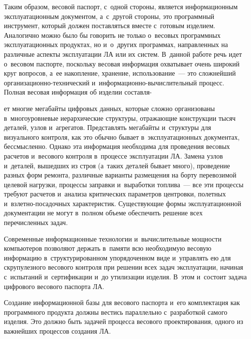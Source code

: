 \begin{multicols}{2}
  Таким образом, весовой паспорт, с~одной стороны, является 
информационным эксплуата\-ционным документом, а~с~другой стороны, это\linebreak 
программный инструмент, который должен по\-став\-лять\-ся вместе с~готовым 
изделием. Аналогично можно было бы говорить не только о~весовых 
программных эксплуатационных продуктах, но и~о~других программах, 
направленных на различные аспекты эксплуатации ЛА или 
их систем. В~данной работе речь идет о~весовом паспорте, поскольку весовая 
информация охватывает очень широкий круг вопросов, а~ее накопление, 
хранение, использование~--- это сложнейший ор\-га\-ни\-за\-ци\-он\-но-тех\-ни\-че\-ский 
и~ин\-фор\-ма\-ци\-он\-но-вы\-чис\-ли\-тель\-ный процесс. Полная весовая информация об 
изделии составля-\linebreak\vspace*{-12pt}

\pagebreak

\noindent
ет многие мегабайты цифровых данных, которые сложно 
организованы в~многоуровневые иерархические структуры, отражающие 
конструкции тысяч деталей, узлов и~агрегатов. Представлять мегабайты 
и~структуры для визуального контроля, как это обычно бывает 
в~эксплуатационных документах, бессмысленно. Однако эта информация 
необходима для проведения весовых расчетов и~весового контроля в~процессе 
эксплуатации ЛА. Замена узлов и~деталей, вышедших из 
строя (а~таких деталей бывает много), проведение разных форм ремонта, 
различные варианты размещения на борту перевозимой целевой нагрузки, 
процессы заправки и~выработки топлива~--- все эти процессы требуют расчетов 
и~анализа критических па\-ра\-мет\-ров цент\-ров\-ки, полетных  
и~взлет\-но-по\-са\-доч\-ных характеристик. Су\-ще\-ст\-ву\-ющие формы 
эксплуатационной документации не могут в~полном объеме обеспечить 
решение всех перечисленных задач.
  
  Современные информационные технологии и~вычислительные мощности 
компьютеров позволяют держать в~памяти всю необходимую весовую 
информацию в~структурированном упорядоченном виде и~управ\-лять ею для 
скрупулезного весового  контроля при решении всех задач эксплуатации, 
начиная с~испытаний и~сертификации и~до утилизации изделия. В~этом 
и~состоит задача цифрового весового паспорта ЛА.   
  
  Создание информационной базы для весового паспорта и~его комплектация 
как программного продукта должны вестись параллельно с~разработкой самого 
изделия. Это должно быть задачей процесса весового проектирования, одного 
из важнейших процессов создания ЛА.


\end{multicols}
